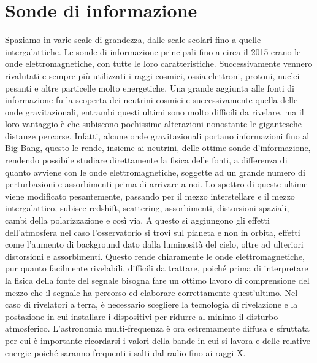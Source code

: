 \documentclass[a4paper,twoside,openany,notitlepage]{book}
\theoremstyle{definition}
\theoremstyle{plain}
\begin{document}
\section{Sonde di informazione}

Spaziamo in varie scale di grandezza, dalle scale scolari fino a quelle intergalattiche.
Le sonde di informazione principali fino a circa il 2015 erano le onde elettromagnetiche, con tutte le loro caratteristiche. Successivamente vennero rivalutati e sempre più utilizzati i raggi cosmici, ossia elettroni, protoni, nuclei pesanti e altre particelle molto energetiche. Una grande aggiunta alle fonti di informazione fu la scoperta dei neutrini cosmici e successivamente quella delle onde gravitazionali, entrambi questi ultimi sono molto difficili da rivelare, ma il loro vantaggio è che subiscono pochissime alterazioni nonostante le gigantesche distanze percorse. Infatti, alcune onde gravitazionali portano informazioni fino al Big Bang, questo le rende, insieme ai neutrini, delle ottime sonde d'informazione, rendendo possibile studiare direttamente la fisica delle fonti, a differenza di quanto avviene con le onde elettromagnetiche, soggette ad un grande numero di perturbazioni e assorbimenti prima di arrivare a noi. Lo spettro di queste ultime viene modificato pesantemente, passando per il mezzo interstellare e il mezzo intergalattico, subisce redshift, scattering, assorbimenti, distorsioni spaziali, cambi della polarizzazione e così via. A questo si aggiungono gli effetti dell'atmosfera nel caso l'osservatorio si trovi sul pianeta e non in orbita, effetti come l'aumento di background dato dalla luminosità del cielo, oltre ad ulteriori distorsioni e assorbimenti. Questo rende chiaramente le onde elettromagnetiche, pur quanto facilmente rivelabili, difficili da trattare, poiché prima di interpretare la fisica della fonte del segnale bisogna fare un ottimo lavoro di comprensione del mezzo che il segnale ha percorso ed elaborare correttamente quest'ultimo. Nel caso di rivelatori a terra, è necessario scegliere la tecnologia di rivelazione e la postazione in cui installare i dispositivi per ridurre al minimo il disturbo atmosferico. L'astronomia multi-frequenza è ora estremamente diffusa e sfruttata per cui è importante ricordarsi i valori della bande in cui si lavora e delle relative energie poiché saranno frequenti i salti dal radio fino ai raggi X.
\end{document}
